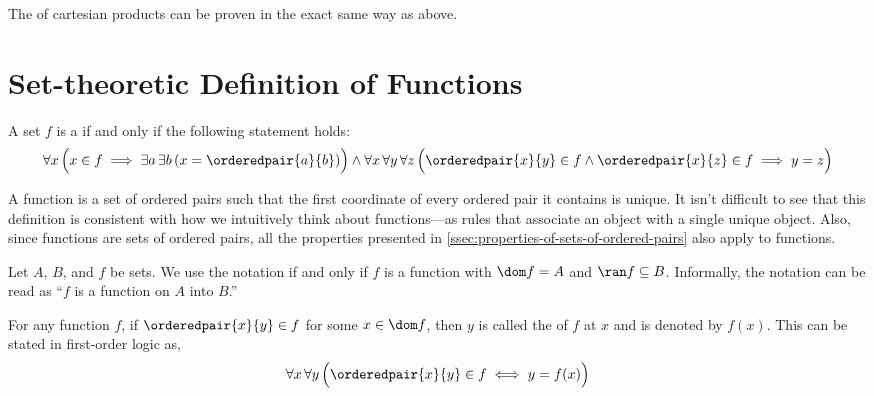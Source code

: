 \begin{rem}
    The  of cartesian products can be proven in the exact same way as above.
\end{rem}

\newpage
\section{Set-theoretic Definition of Functions}
\begin{dfn}
    \label{dfn:function-basic}
    A set \( f \) is a  if and only if the following statement holds:
    \begin{equation*}
        \forall x \, \Big( x \in f \implies \exists a \, \exists b \, \mleft( x = \orderedpair{a}{b} \mright) \Big)
        \land
        \forall x \, \forall y \, \forall z \, \Big( {\orderedpair{x}{y}} \in f \land \orderedpair{x}{z} \in f \implies y = z \Big)
    \end{equation*}
\end{dfn}

\begin{rem}
    A function is a set of ordered pairs such that the first coordinate of every ordered pair it contains is unique.
    It isn't difficult to see that this definition is consistent with how we intuitively think about functions---as rules
    that associate an object with a single unique object. Also, since functions are sets of ordered pairs, all the properties
    presented in \cref{ssec:properties-of-sets-of-ordered-pairs} also apply to functions.
\end{rem}


\begin{dfn}
    \label{dfn:arrow-notation}
    Let \( A \), \( B \), and \( f \) be  sets. We use the notation
     if and only if \( f \) is a function with \( \dom f = A \) and \( \ran f \subseteq B \).
    Informally, the notation can be read as ``\( f \) is a function on \( A \) into \( B \).''
\end{dfn}

\begin{dfn}
     \label{dfn:functional-notation}
    For any function \( f \), if \( \orderedpair{x}{y} \in f \) for some \( x \in \dom f \), then
    \( y \) is called the  of \( f \) at \( x \) and is denoted by \( f(x) \).
    This can be stated in first-order logic as,
    \begin{equation*}
        \forall x \, \forall y \, \Big(
        \orderedpair{x}{y} \in f
        \iff
        y = f(x) \Big)
    \end{equation*}
\end{dfn}

